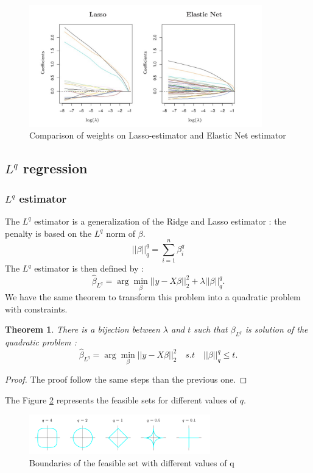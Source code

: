\documentclass[a4paper,12pt]{article}
\newtheorem*{thm}{Theorem}
\begin{document}
\begin{figure}[!h]
\centerline{
\includegraphics[width = 0.9\textwidth]{figures/lassoenet.png}}
\caption{Comparison of weights on Lasso-estimator and Elastic Net estimator}
\label{Lassoenet}
\end{figure}

\subsection{$L^q$ regression}
\subsubsection{$L^q$ estimator}
The $L^q$ estimator is a generalization of the Ridge and Lasso estimator : the penalty is based on the $L^q$ norm of $\beta$.
\[||\beta||_q^q = \sum_{i = 1}^{n}{\beta_{i}^q}\]
The $L^q$ estimator is then defined by :
\[ \hat{\beta}_\text{$L^q$} = \arg \min_\beta ||y - X\beta||_2^2 + \lambda ||\beta||_q^q. \]
We have the same theorem to transform this problem into a quadratic problem with constraints.\\

\begin{thm} There is a bijection between $\lambda$ and $t$ such that ${\beta}_\text{$L^q$}$ is solution of the quadratic problem : 
\[ \hat{\beta}_\text{$L^q$} = \arg \min_\beta ||y - X\beta||_2^2 \quad s.t \quad ||\beta||_q^q\leq t. \]
\end{thm}

\begin{proof}
The proof follow the same steps than the previous one.
\end{proof}

The Figure \ref{Bound2} represents the feasible sets for different values of $q$.
\begin{figure}[!h]
\centerline{
\includegraphics[width = 0.7\textwidth]{figures/bound.png}}
\caption{Boundaries of the feasible set with different values of q}
\label{Bound2}
\end{figure}
\end{document}
